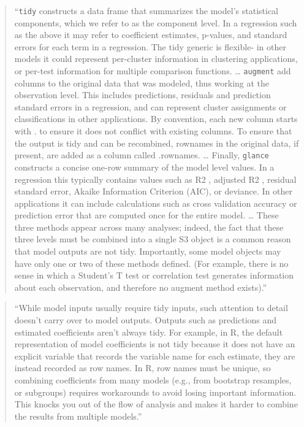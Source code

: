 \documentclass[]{tufte-book}
\begin{document}
\begin{quote}
``\texttt{tidy} constructs a data frame that summarizes the model's statistical
components, which we refer to as the component level. In a regression such as
the above it may refer to coefficient estimates, p-values, and standard errors
for each term in a regression. The tidy generic is flexible- in other models it
could represent per-cluster information in clustering applications, or per-test
information for multiple comparison functions. \ldots{} \texttt{augment} add columns to the
original data that was modeled, thus working at the observation level. This
includes predictions, residuals and prediction standard errors in a regression,
and can represent cluster assignments or classifications in other applications.
By convention, each new column starts with . to ensure it does not conflict with
existing columns. To ensure that the output is tidy and can be recombined,
rownames in the original data, if present, are added as a column called
.rownames. \ldots{} Finally, \texttt{glance} constructs a concise one-row summary of the
model level values. In a regression this typically contains values such as R2 ,
adjusted R2 , residual standard error, Akaike Information Criterion (AIC), or
deviance. In other applications it can include calculations such as cross
validation accuracy or prediction error that are computed once for the entire
model. \ldots{} These three methods appear across many analyses; indeed, the fact
that these three levels must be combined into a single S3 object is a common
reason that model outputs are not tidy. Importantly, some model objects may have
only one or two of these methods defined. (For example, there is no sense in
which a Student's T test or correlation test generates information about each
observation, and therefore no augment method exists).'' \citep{robinson2014broom}
\end{quote}

\begin{quote}
``While model inputs usually require tidy inputs, such attention to detail
doesn't carry over to model outputs. Outputs such as predictions and estimated
coefficients aren't always tidy. For example, in R, the default representation
of model coefficients is not tidy because it does not have an explicit variable
that records the variable name for each estimate, they are instead recorded as
row names. In R, row names must be unique, so combining coefficients from many
models (e.g., from bootstrap resamples, or subgroups) requires workarounds to
avoid losing important information. This knocks you out of the flow of analysis
and makes it harder to combine the results from multiple models.''
\citep{wickham2014tidy}
\end{quote}
\end{document}
